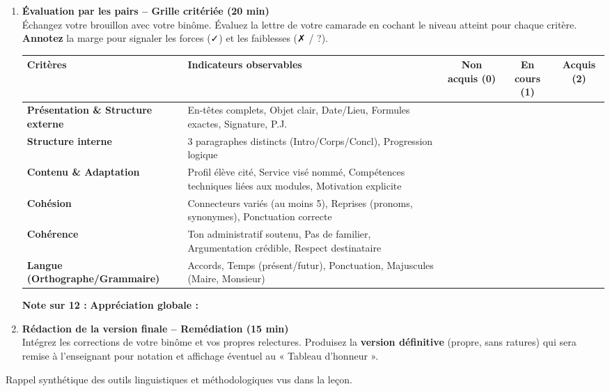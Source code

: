 \documentclass[11pt]{article}
\newcounter{popsec}
\newcounter{popsub}
\newcommand{\courssub}[1]{%
  \stepcounter{popsub}%
  \par\vspace{9pt}\noindent{\popxbold\fontsize{11.5}{13}\selectfont\color{popink}{\color{poporange}\thepopsec.\thepopsub}\hspace{6pt}#1}\par\nopagebreak\vspace{4pt}
}
\begin{document}
\begin{enumerate}
    \item \textbf{Évaluation par les pairs -- Grille critériée (20 min)} \\
    Échangez votre brouillon avec votre binôme. Évaluez la lettre de votre camarade en cochant le niveau atteint pour chaque critère. \textbf{Annotez} la marge pour signaler les forces (✓) et les faiblesses (✗ / ?).
    
    \begin{center}
    \begin{tabularx}{\linewidth}{|l|X|c|c|c|}\hline
    \rowcolor{popblueL} \textbf{Critères} & \textbf{Indicateurs observables} & \textbf{Non acquis (0)} & \textbf{En cours (1)} & \textbf{Acquis (2)} \\ \hline
    \textbf{Présentation \& Structure externe} & En-têtes complets, Objet clair, Date/Lieu, Formules exactes, Signature, P.J. & & & \\ \hline
    \textbf{Structure interne} & 3 paragraphes distincts (Intro/Corps/Concl), Progression logique & & & \\ \hline
    \textbf{Contenu \& Adaptation} & Profil élève cité, Service visé nommé, Compétences techniques liées aux modules, Motivation explicite & & & \\ \hline
    \textbf{Cohésion} & Connecteurs variés (au moins 5), Reprises (pronoms, synonymes), Ponctuation correcte & & & \\ \hline
    \textbf{Cohérence} & Ton administratif soutenu, Pas de familier, Argumentation crédible, Respect destinataire & & & \\ \hline
    \textbf{Langue (Orthographe/Grammaire)} & Accords, Temps (présent/futur), Ponctuation, Majuscules (Maire, Monsieur) & & & \\ \hline
    \end{tabularx}
    \end{center}
    \textbf{Note sur 12 :} \hrulefill \quad \textbf{Appréciation globale :} \hrulefill

    \item \textbf{Rédaction de la version finale -- Remédiation (15 min)} \\
    Intégrez les corrections de votre binôme et vos propres relectures. Produisez la \textbf{version définitive} (propre, sans ratures) qui sera remise à l'enseignant pour notation et affichage éventuel au « Tableau d'honneur ».
\end{enumerate}

\courssub{Ressources à mobiliser}
\noindent Rappel synthétique des outils linguistiques et méthodologiques vus dans la leçon.
\end{document}
